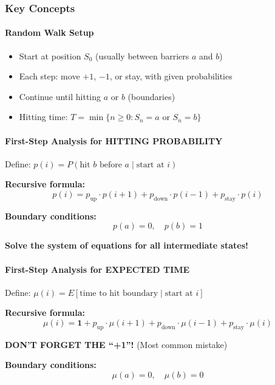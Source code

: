 \documentclass[11pt,letterpaper]{article}
\begin{document}
\subsubsection{Key Concepts}

\paragraph{Random Walk Setup}
\begin{itemize}
  \item Start at position $S_0$ (usually between barriers $a$ and $b$)
  \item Each step: move $+1$, $-1$, or stay, with given probabilities
  \item Continue until hitting $a$ or $b$ (boundaries)
  \item Hitting time: $T = \min\{n \geq 0 : S_n = a \text{ or } S_n = b\}$
\end{itemize}

\paragraph{First-Step Analysis for HITTING PROBABILITY}

\begin{tcolorbox}[colback=yellow!10,colframe=orange!80,title=First-Step Analysis - Hitting Probability]
Define: $p(i) = P(\text{hit } b \text{ before } a \mid \text{start at } i)$

\textbf{Recursive formula:}
\[
p(i) = p_{\text{up}} \cdot p(i+1) + p_{\text{down}} \cdot p(i-1) + p_{\text{stay}} \cdot p(i)
\]

\textbf{Boundary conditions:}
\[
p(a) = 0, \quad p(b) = 1
\]

\textbf{Solve the system of equations for all intermediate states!}
\end{tcolorbox}

\paragraph{First-Step Analysis for EXPECTED TIME}

\begin{tcolorbox}[colback=red!10,colframe=red!80,title=First-Step Analysis - Expected Time]
Define: $\mu(i) = E[\text{time to hit boundary} \mid \text{start at } i]$

\textbf{Recursive formula:}
\[
\mu(i) = \mathbf{1} + p_{\text{up}} \cdot \mu(i+1) + p_{\text{down}} \cdot \mu(i-1) + p_{\text{stay}} \cdot \mu(i)
\]

\textbf{DON'T FORGET THE ``+1''!} (Most common mistake)

\textbf{Boundary conditions:}
\[
\mu(a) = 0, \quad \mu(b) = 0
\]
\end{tcolorbox}
\end{document}
